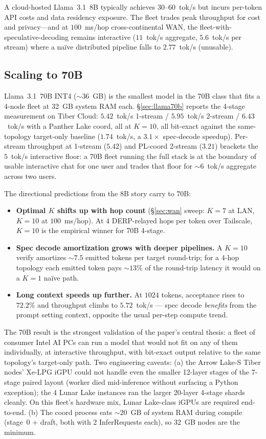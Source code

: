 \documentclass[11pt]{article}
\begin{document}
A cloud-hosted Llama~3.1~8B typically achieves $30$--$60$~tok/s but incurs per-token API costs and data residency exposure. The fleet trades peak throughput for cost and privacy---and at $100$~ms/hop cross-continental WAN, the fleet-with-speculative-decoding remains interactive ($11$~tok/s aggregate, $5.6$~tok/s per stream) where a naïve distributed pipeline falls to $2.77$~tok/s (unusable).

\subsection{Scaling to 70B}

Llama~3.1~70B INT4 ($\sim 36$~GB) is the smallest model in the 70B class that fits a 4-node fleet at 32~GB system RAM each. \S\ref{sec:llama70b} reports the 4-stage measurement on Tiber Cloud: $5.42$~tok/s 1-stream / $5.95$~tok/s 2-stream / $6.43$~tok/s with a Panther Lake coord, all at $K\!=\!10$, all bit-exact against the same-topology target-only baseline ($1.74$~tok/s, a $3.1\times$ spec-decode speedup). Per-stream throughput at 1-stream ($5.42$) and PL-coord 2-stream ($3.21$) brackets the $5$~tok/s interactive floor: a 70B fleet running the full stack is at the boundary of usable interactive chat for one user and trades that floor for $\sim 6$~tok/s aggregate across two users.

The directional predictions from the 8B story carry to 70B:
\begin{itemize}[leftmargin=*]
  \item \textbf{Optimal $K$ shifts up with hop count} (\S\ref{sec:wan} sweep: $K\!=\!7$ at LAN, $K\!=\!10$ at $100$~ms/hop). At $4$ DERP-relayed hops per token over Tailscale, $K\!=\!10$ is the empirical winner for 70B 4-stage.
  \item \textbf{Spec decode amortization grows with deeper pipelines.} A $K\!=\!10$ verify amortizes $\sim 7.5$ emitted tokens per target round-trip; for a 4-hop topology each emitted token pays $\sim 13\%$ of the round-trip latency it would on a $K\!=\!1$ naïve path.
  \item \textbf{Long context speeds up further.} At $1024$ tokens, acceptance rises to $72.2\%$ and throughput climbs to $5.72$~tok/s --- spec decode \emph{benefits} from the prompt setting context, opposite the usual per-step compute trend.
\end{itemize}

The 70B result is the strongest validation of the paper's central thesis: a fleet of consumer Intel AI PCs can run a model that would not fit on any of them individually, at interactive throughput, with bit-exact output relative to the same topology's target-only path. Two engineering caveats: (a) the Arrow Lake-S Tiber nodes' Xe-LPG iGPU could not handle even the smaller 12-layer stages of the 7-stage paired layout (worker died mid-inference without surfacing a Python exception); the 4 Lunar Lake instances ran the larger 20-layer 4-stage shards cleanly. On this fleet's hardware mix, Lunar Lake-class iGPUs are required end-to-end. (b) The coord process eats $\sim 20$~GB of system RAM during compile (stage~0 + draft, both with 2 InferRequests each), so 32~GB nodes are the minimum.
\end{document}
